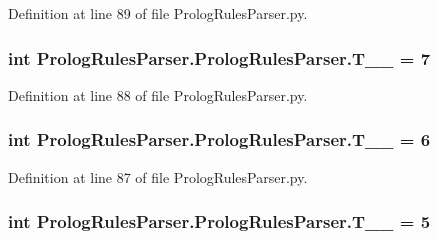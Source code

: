 Definition at line 89 of file Prolog\+Rules\+Parser.\+py.

\hypertarget{class_prolog_rules_parser_1_1_prolog_rules_parser_a2d9aeabd6a653e6300aa32084c9f4983}{}
\subsubsection[{T\+\_\+\+\_\+2}]{\setlength{\rightskip}{0pt plus 5cm}int Prolog\+Rules\+Parser.\+Prolog\+Rules\+Parser.\+T\+\_\+\+\_ = 7\hspace{0.3cm}{\ttfamily [static]}}\label{class_prolog_rules_parser_1_1_prolog_rules_parser_a2d9aeabd6a653e6300aa32084c9f4983}


Definition at line 88 of file Prolog\+Rules\+Parser.\+py.

\hypertarget{class_prolog_rules_parser_1_1_prolog_rules_parser_a4f48ff3491d8e3fbe7075caf04d8e006}{}
\subsubsection[{T\+\_\+\+\_\+3}]{\setlength{\rightskip}{0pt plus 5cm}int Prolog\+Rules\+Parser.\+Prolog\+Rules\+Parser.\+T\+\_\+\+\_ = 6\hspace{0.3cm}{\ttfamily [static]}}\label{class_prolog_rules_parser_1_1_prolog_rules_parser_a4f48ff3491d8e3fbe7075caf04d8e006}


Definition at line 87 of file Prolog\+Rules\+Parser.\+py.

\hypertarget{class_prolog_rules_parser_1_1_prolog_rules_parser_a844dee3952dd7f26e6b3dcb345e22a91}{}
\subsubsection[{T\+\_\+\+\_\+4}]{\setlength{\rightskip}{0pt plus 5cm}int Prolog\+Rules\+Parser.\+Prolog\+Rules\+Parser.\+T\+\_\+\+\_ = 5\hspace{0.3cm}{\ttfamily [static]}}\label{class_prolog_rules_parser_1_1_prolog_rules_parser_a844dee3952dd7f26e6b3dcb345e22a91}


